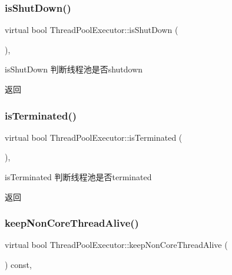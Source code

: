 \subsubsection{\texorpdfstring{is\+Shut\+Down()}{isShutDown()}}
{\footnotesize\ttfamily virtual bool Thread\+Pool\+Executor\+::is\+Shut\+Down (\begin{DoxyParamCaption}{ }\end{DoxyParamCaption})\hspace{0.3cm}{\ttfamily [final]}, {\ttfamily [virtual]}}



is\+Shut\+Down 判断线程池是否shutdown 

\begin{DoxyReturn}{返回}

\end{DoxyReturn}
\mbox{\label{classThreadPoolExecutor_a89ed68d6c67ad6fbde73b7883c8107a7}} 
\subsubsection{\texorpdfstring{is\+Terminated()}{isTerminated()}}
{\footnotesize\ttfamily virtual bool Thread\+Pool\+Executor\+::is\+Terminated (\begin{DoxyParamCaption}{ }\end{DoxyParamCaption})\hspace{0.3cm}{\ttfamily [final]}, {\ttfamily [virtual]}}



is\+Terminated 判断线程池是否terminated 

\begin{DoxyReturn}{返回}

\end{DoxyReturn}
\mbox{\label{classThreadPoolExecutor_ac2aa11f7cde6e6082eb0dde8f2385dce}} 
\subsubsection{\texorpdfstring{keep\+Non\+Core\+Thread\+Alive()}{keepNonCoreThreadAlive()}\hspace{0.1cm}{\footnotesize\ttfamily [1/2]}}
{\footnotesize\ttfamily virtual bool Thread\+Pool\+Executor\+::keep\+Non\+Core\+Thread\+Alive (\begin{DoxyParamCaption}{ }\end{DoxyParamCaption}) const\hspace{0.3cm}{\ttfamily [final]}, {\ttfamily [virtual]}}



